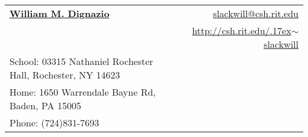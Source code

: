 \documentclass[letterpaper,11pt]{article}
\begin{document}
\newcommand{\mywebheader}{
\begin{tabular*}{7in}{l@{\extracolsep{\fill}}r}
	\textbf{\href{http://csh.rit.edu/~slackwill}{\Huge William M. Dignazio}} & \href{mailto:slackwill@csh.rit.edu}{slackwill@csh.rit.edu}\\ &
	\href{http://csh.rit.edu/~slackwill}{http://csh.rit.edu/{\raise.17ex\hbox{$\scriptstyle\mathtt{\sim}$}}slackwill} \\
	{\footnotesize {{School: 03315 Nathaniel Rochester Hall,
Rochester, NY 14623}}} & \\
	{\footnotesize {{Home: 1650 Warrendale Bayne Rd, Baden, PA 15005}}} & \\
	{\footnotesize {{Phone: (724)831-7693}}} & 

	\end{tabular*}
\\
\vspace{0.1in}}

\mywebheader
\end{document}
